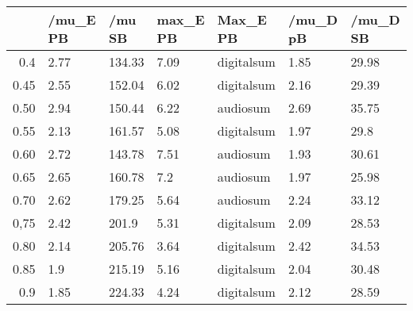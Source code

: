 \begin{table}[ht]
\centering
\begin{tabular}{rllllll}
  \hline
 & /mu\_E PB & /mu SB & max\_E PB & Max\_E PB & /mu\_D pB & /mu\_D SB \\ 
  \hline
0.4 & 2.77 & 134.33 & 7.09 & digitalsum & 1.85 & 29.98 \\ 
  0.45 & 2.55 & 152.04 & 6.02 & digitalsum & 2.16 & 29.39 \\ 
  0.50 & 2.94 & 150.44 & 6.22 & audiosum & 2.69 & 35.75 \\ 
  0.55 & 2.13 & 161.57 & 5.08 & digitalsum & 1.97 & 29.8 \\ 
  0.60 & 2.72 & 143.78 & 7.51 & audiosum & 1.93 & 30.61 \\ 
  0.65 & 2.65 & 160.78 & 7.2 & audiosum & 1.97 & 25.98 \\ 
  0.70 & 2.62 & 179.25 & 5.64 & audiosum & 2.24 & 33.12 \\ 
  0,75 & 2.42 & 201.9 & 5.31 & digitalsum & 2.09 & 28.53 \\ 
  0.80 & 2.14 & 205.76 & 3.64 & digitalsum & 2.42 & 34.53 \\ 
  0.85 & 1.9 & 215.19 & 5.16 & digitalsum & 2.04 & 30.48 \\ 
  0.9 & 1.85 & 224.33 & 4.24 & digitalsum & 2.12 & 28.59 \\ 
   \hline
\end{tabular}
\end{table}
